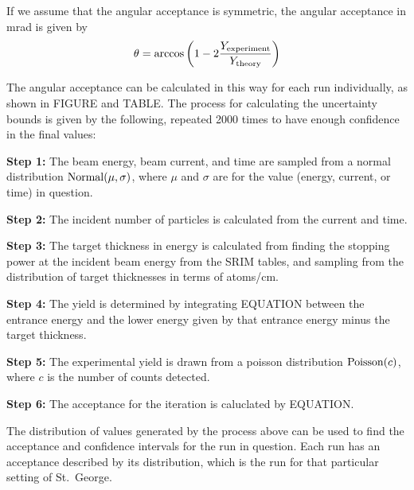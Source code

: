 If we assume that the angular acceptance is symmetric, the angular acceptance
in mrad is given by
\begin{equation}
    \theta = \arccos\left(1 - 2 \frac{Y_{\rm experiment}}{Y_{\rm theory}}\right)
\end{equation}

The angular acceptance can be calculated in this way for each run
individually, as shown in FIGURE and TABLE. The process for
calculating the uncertainty bounds is given by the following, repeated
2000 times to have enough confidence in the final values:

\textbf{Step 1:}
  The beam energy, beam current, and time are sampled from a normal
  distribution ${\rm Normal}(\mu,\sigma)$, where $\mu$ and $\sigma$ are for the value
  (energy, current, or time) in question.

\textbf{Step 2:}
  The incident number of particles is calculated from the current and
  time.

\textbf{Step 3:}
  The target thickness in energy is calculated from finding the stopping
  power at the incident beam energy from the SRIM tables, and sampling
  from the distribution of target thicknesses in terms of atoms/cm\squared{}.

\textbf{Step 4:}
  The yield is determined by integrating EQUATION between the
  entrance energy and the lower energy given by that entrance energy
  minus the target thickness.

\textbf{Step 5:}
  The experimental yield is drawn from a poisson distribution
  ${\rm Poisson}(c)$, where $c$ is the number of counts detected.

\textbf{Step 6:}
  The acceptance for the iteration is caluclated by EQUATION.

The distribution of values generated by the process above can be used to
find the acceptance and confidence intervals for the run in question.
Each run has an acceptance described by its distribution, which is the
run for that particular setting of St.\ George.
